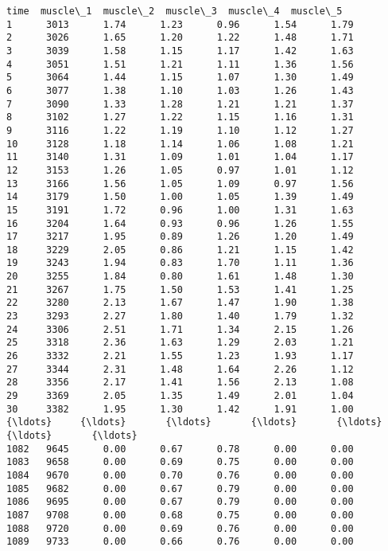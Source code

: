 \documentclass[11pt]{article}
\begin{document}
    \begin{Verbatim}[commandchars=\\\{\}]
       time  muscle\_1  muscle\_2  muscle\_3  muscle\_4  muscle\_5
1      3013      1.74      1.23      0.96      1.54      1.79
2      3026      1.65      1.20      1.22      1.48      1.71
3      3039      1.58      1.15      1.17      1.42      1.63
4      3051      1.51      1.21      1.11      1.36      1.56
5      3064      1.44      1.15      1.07      1.30      1.49
6      3077      1.38      1.10      1.03      1.26      1.43
7      3090      1.33      1.28      1.21      1.21      1.37
8      3102      1.27      1.22      1.15      1.16      1.31
9      3116      1.22      1.19      1.10      1.12      1.27
10     3128      1.18      1.14      1.06      1.08      1.21
11     3140      1.31      1.09      1.01      1.04      1.17
12     3153      1.26      1.05      0.97      1.01      1.12
13     3166      1.56      1.05      1.09      0.97      1.56
14     3179      1.50      1.00      1.05      1.39      1.49
15     3191      1.72      0.96      1.00      1.31      1.63
16     3204      1.64      0.93      0.96      1.26      1.55
17     3217      1.95      0.89      1.26      1.20      1.49
18     3229      2.05      0.86      1.21      1.15      1.42
19     3243      1.94      0.83      1.70      1.11      1.36
20     3255      1.84      0.80      1.61      1.48      1.30
21     3267      1.75      1.50      1.53      1.41      1.25
22     3280      2.13      1.67      1.47      1.90      1.38
23     3293      2.27      1.80      1.40      1.79      1.32
24     3306      2.51      1.71      1.34      2.15      1.26
25     3318      2.36      1.63      1.29      2.03      1.21
26     3332      2.21      1.55      1.23      1.93      1.17
27     3344      2.31      1.48      1.64      2.26      1.12
28     3356      2.17      1.41      1.56      2.13      1.08
29     3369      2.05      1.35      1.49      2.01      1.04
30     3382      1.95      1.30      1.42      1.91      1.00
{\ldots}     {\ldots}       {\ldots}       {\ldots}       {\ldots}       {\ldots}       {\ldots}
1082   9645      0.00      0.67      0.78      0.00      0.00
1083   9658      0.00      0.69      0.75      0.00      0.00
1084   9670      0.00      0.70      0.76      0.00      0.00
1085   9682      0.00      0.67      0.79      0.00      0.00
1086   9695      0.00      0.67      0.79      0.00      0.00
1087   9708      0.00      0.68      0.75      0.00      0.00
1088   9720      0.00      0.69      0.76      0.00      0.00
1089   9733      0.00      0.66      0.76      0.00      0.00

\end{Verbatim}
\end{document}
